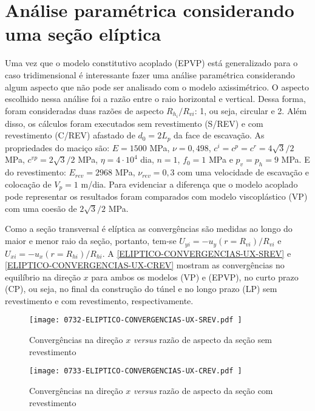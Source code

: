 \section{Análise paramétrica considerando uma seção elíptica}

Uma vez que o modelo constitutivo acoplado (EPVP) está generalizado para o caso tridimensional é interessante fazer uma análise paramétrica considerando algum aspecto que não pode ser analisado com o modelo axissimétrico. O aspecto escolhido nessa análise foi a razão entre o raio horizontal e vertical. Dessa forma, foram consideradas duas razões de aspecto $R_{h_i}/R_{vi}$: 1, ou seja, circular e 2. Além disso, os cálculos foram executados sem revestimento (S/REV) e com revestimento (C/REV) afastado de $d_0=2L_p$ da face de escavação. As propriedades do maciço são: $E=1500$ MPa, $\nu=0,498$, $c^i=c^p=c^r =4\sqrt{3}/2$ MPa, $c^{vp}=2\sqrt{3}/2$ MPa, $\eta = 4 \cdot 10^4$ dia, $n=1$, $f_0=1$ MPa e $p_v=p_h=9$ MPa. E do revestimento: $E_{rev}=2968$ MPa, $\nu_{rev}=0,3$ com uma velocidade de escavação e colocação de $V_p=1$ m/dia. Para evidenciar a diferença que o modelo acoplado pode representar os resultados foram comparados com modelo viscoplástico (VP) com uma coesão de $2\sqrt{3}/2$ MPa.

Como a seção transversal é elíptica as convergências são medidas ao longo do maior e menor raio da seção, portanto,  tem-se $U_{yi} = -u_y(r=R_{vi})/R_{vi}$ e $U_{xi} = -u_x(r=R_{hi})/R_{hi}$.  A \autoref{ELIPTICO-CONVERGENCIAS-UX-SREV} e \autoref{ELIPTICO-CONVERGENCIAS-UX-CREV} mostram as convergências no equilíbrio na direção $x$ para ambos os modelos (VP) e (EPVP), no curto prazo (CP), ou seja, no final da construção do túnel e no longo prazo (LP) sem revestimento e com revestimento, respectivamente.


\begin{figure}[H]
	\begin{center}
		\texttt{[image: 0732-ELIPTICO-CONVERGENCIAS-UX-SREV.pdf
		]}
	\end{center}
	\caption{\label{ELIPTICO-CONVERGENCIAS-UX-SREV}Convergências na direção $x$ \textit{versus} razão de aspecto da seção sem revestimento}
\end{figure}

\begin{figure}[H]
	\begin{center}
		\texttt{[image: 0733-ELIPTICO-CONVERGENCIAS-UX-CREV.pdf
		]}
	\end{center}
	\caption{\label{ELIPTICO-CONVERGENCIAS-UX-CREV}Convergências na direção $x$ \textit{versus} razão de aspecto da seção com revestimento}
\end{figure}

